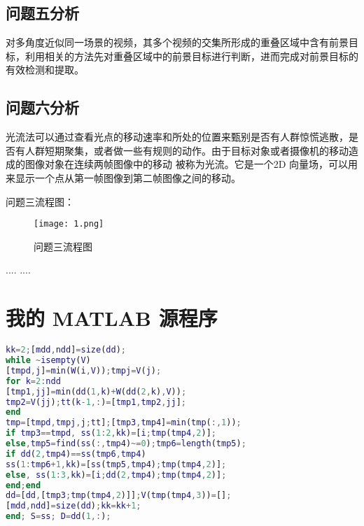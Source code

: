 \documentclass[bwprint]{gmcmthesis}
\begin{document}
\subsection{问题五分析}
对多角度近似同一场景的视频，其多个视频的交集所形成的重叠区域中含有前景目标，利用相关的方法先对重叠区域中的前景目标进行判断，进而完成对前景目标的有效检测和提取。

\subsection{问题六分析}
光流法可以通过查看光点的移动速率和所处的位置来甄别是否有人群惊慌逃散，是否有人群短期聚集，或者做一些有规则的动作。由于目标对象或者摄像机的移动造成的图像对象在连续两帧图像中的移动 被称为光流。它是一个2D 向量场，可以用来显示一个点从第一帧图像到第二帧图像之间的移动。




问题三流程图：
\begin{figure}[!h]
\centering
\texttt{[image: 1.png]}
\caption{问题三流程图}
\end{figure}

\begin{thebibliography}{9}%
  ....
  ....
\end{thebibliography}

\newpage
\appendix
\section{我的 MATLAB 源程序}
\begin{lstlisting}[language=Matlab]%设置不同语言即可。
kk=2;[mdd,ndd]=size(dd);
while ~isempty(V)
[tmpd,j]=min(W(i,V));tmpj=V(j);
for k=2:ndd
[tmp1,jj]=min(dd(1,k)+W(dd(2,k),V));
tmp2=V(jj);tt(k-1,:)=[tmp1,tmp2,jj];
end
tmp=[tmpd,tmpj,j;tt];[tmp3,tmp4]=min(tmp(:,1));
if tmp3==tmpd, ss(1:2,kk)=[i;tmp(tmp4,2)];
else,tmp5=find(ss(:,tmp4)~=0);tmp6=length(tmp5);
if dd(2,tmp4)==ss(tmp6,tmp4)
ss(1:tmp6+1,kk)=[ss(tmp5,tmp4);tmp(tmp4,2)];
else, ss(1:3,kk)=[i;dd(2,tmp4);tmp(tmp4,2)];
end;end
dd=[dd,[tmp3;tmp(tmp4,2)]];V(tmp(tmp4,3))=[];
[mdd,ndd]=size(dd);kk=kk+1;
end; S=ss; D=dd(1,:);


 \end{lstlisting}
\end{document}
